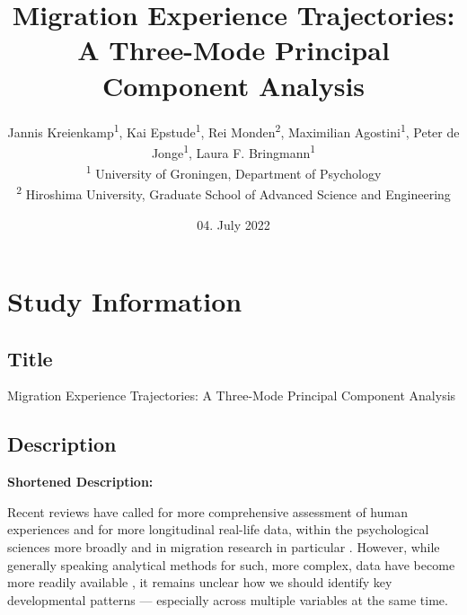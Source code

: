 \documentclass[]{article}
\title{Migration Experience Trajectories: A Three-Mode Principal
Component Analysis}
\author{
          Jannis Kreienkamp\textsuperscript{1},
          Kai Epstude\textsuperscript{1},
          Rei Monden\textsuperscript{2},
          Maximilian Agostini\textsuperscript{1},
          Peter de Jonge\textsuperscript{1},
          Laura F.
Bringmann\textsuperscript{1}          \\ \vspace{0.5cm}
              \textsuperscript{1} University of Groningen, Department of
Psychology\\
              \textsuperscript{2} Hiroshima University, Graduate School
of Advanced Science and Engineering      }
\date{04. July 2022}
\newcounter{question}
\begin{document}
\maketitle
\vspace{2pc}


\ifPDFTeX
  \newcommand\Question[2]{%
   \leavevmode\par
   \stepcounter{question}
   \noindent
   \textbf{\thequestion. #1}. #2\par}
\else %
  \NewCommandCopy{\oldQuestion}{\Question}
  \renewcommand\Question[2]{%
   \leavevmode\par
   \stepcounter{question}
   \noindent
   \textbf{\thequestion. #1}. #2\par}
\fi



\newcommand\Answer[1]{%
    \noindent
    \textit{Registered response}: #1\par}

\newlength{\mylength}
\setlength{\fboxsep}{15pt}
\setlength{\mylength}{\linewidth}
\addtolength{\mylength}{-2\fboxsep}
\addtolength{\mylength}{-2\fboxrule}

\hypertarget{study-information}{%
\section{Study Information}\label{study-information}}

\hypertarget{title}{%
\subsection{Title}\label{title}}

Migration Experience Trajectories: A Three-Mode Principal Component
Analysis

\hypertarget{description}{%
\subsection{Description}\label{description}}

\textbf{Shortened Description:}

Recent reviews have called for more comprehensive assessment of human
experiences and for more longitudinal real-life data, within the
psychological sciences more broadly and in migration research in
particular
\citep[e.g.,][]{Kreienkamp2022d, MacInnis2015, McKeown2017, Pettigrew2011, Ward2019}.
However, while generally speaking analytical methods for such, more
complex, data have become more readily available
\citep[e.g.,][]{ODonnell2021}, it remains unclear how we should identify
key developmental patterns --- especially across multiple variables at
the same time.
\end{document}
